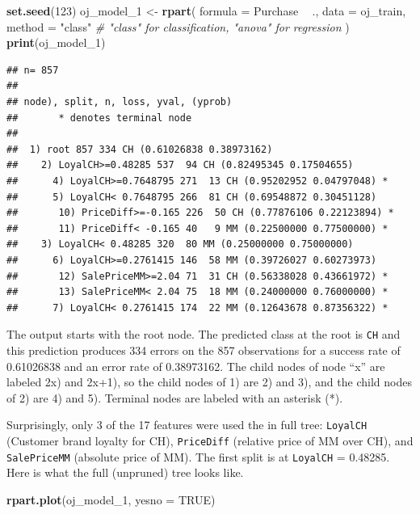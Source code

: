 \documentclass[
]{book}
\newenvironment{Shaded}{\begin{snugshade}}{\end{snugshade}}
\newcommand{\CommentTok}[1]{\textcolor[rgb]{0.56,0.35,0.01}{\textit{#1}}}
\newcommand{\DataTypeTok}[1]{\textcolor[rgb]{0.13,0.29,0.53}{#1}}
\newcommand{\DecValTok}[1]{\textcolor[rgb]{0.00,0.00,0.81}{#1}}
\newcommand{\KeywordTok}[1]{\textcolor[rgb]{0.13,0.29,0.53}{\textbf{#1}}}
\newcommand{\NormalTok}[1]{#1}
\newcommand{\OperatorTok}[1]{\textcolor[rgb]{0.81,0.36,0.00}{\textbf{#1}}}
\newcommand{\OtherTok}[1]{\textcolor[rgb]{0.56,0.35,0.01}{#1}}
\newcommand{\StringTok}[1]{\textcolor[rgb]{0.31,0.60,0.02}{#1}}
\begin{document}
\begin{Shaded}
\begin{Highlighting}[]
\KeywordTok{set.seed}\NormalTok{(}\DecValTok{123}\NormalTok{)}
\NormalTok{oj_model_}\DecValTok{1}\NormalTok{ <-}\StringTok{ }\KeywordTok{rpart}\NormalTok{(}
   \DataTypeTok{formula =}\NormalTok{ Purchase }\OperatorTok{~}\StringTok{ }\NormalTok{.,}
   \DataTypeTok{data =}\NormalTok{ oj_train,}
   \DataTypeTok{method =} \StringTok{"class"}  \CommentTok{# "class" for classification, "anova" for regression}
\NormalTok{   )}
\KeywordTok{print}\NormalTok{(oj_model_}\DecValTok{1}\NormalTok{)}
\end{Highlighting}
\end{Shaded}

\begin{verbatim}
## n= 857 
## 
## node), split, n, loss, yval, (yprob)
##       * denotes terminal node
## 
##  1) root 857 334 CH (0.61026838 0.38973162)  
##    2) LoyalCH>=0.48285 537  94 CH (0.82495345 0.17504655)  
##      4) LoyalCH>=0.7648795 271  13 CH (0.95202952 0.04797048) *
##      5) LoyalCH< 0.7648795 266  81 CH (0.69548872 0.30451128)  
##       10) PriceDiff>=-0.165 226  50 CH (0.77876106 0.22123894) *
##       11) PriceDiff< -0.165 40   9 MM (0.22500000 0.77500000) *
##    3) LoyalCH< 0.48285 320  80 MM (0.25000000 0.75000000)  
##      6) LoyalCH>=0.2761415 146  58 MM (0.39726027 0.60273973)  
##       12) SalePriceMM>=2.04 71  31 CH (0.56338028 0.43661972) *
##       13) SalePriceMM< 2.04 75  18 MM (0.24000000 0.76000000) *
##      7) LoyalCH< 0.2761415 174  22 MM (0.12643678 0.87356322) *
\end{verbatim}

The output starts with the root node. The predicted class at the root is \texttt{CH} and this prediction produces 334 errors on the 857 observations for a success rate of 0.61026838 and an error rate of 0.38973162. The child nodes of node ``x'' are labeled 2x) and 2x+1), so the child nodes of 1) are 2) and 3), and the child nodes of 2) are 4) and 5). Terminal nodes are labeled with an asterisk (*).

Surprisingly, only 3 of the 17 features were used the in full tree: \texttt{LoyalCH} (Customer brand loyalty for CH), \texttt{PriceDiff} (relative price of MM over CH), and \texttt{SalePriceMM} (absolute price of MM). The first split is at \texttt{LoyalCH} = 0.48285. Here is what the full (unpruned) tree looks like.

\begin{Shaded}
\begin{Highlighting}[]
\KeywordTok{rpart.plot}\NormalTok{(oj_model_}\DecValTok{1}\NormalTok{, }\DataTypeTok{yesno =} \OtherTok{TRUE}\NormalTok{)}
\end{Highlighting}
\end{Shaded}
\end{document}
